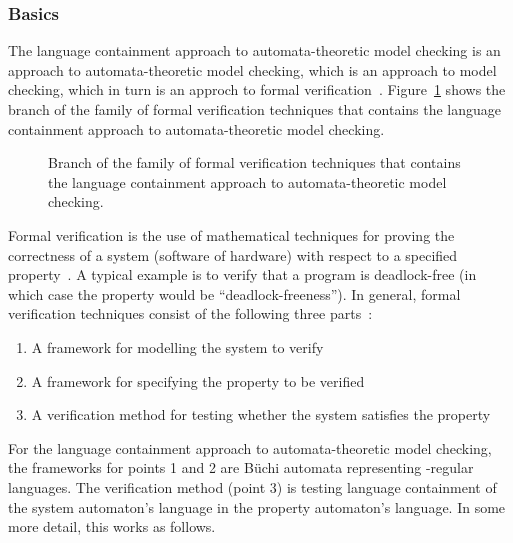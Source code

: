 \subsubsection{Basics}
The language containment approach to automata-theoretic model checking is an approach to automata-theoretic model checking, which is an approach to model checking, which in turn is an approch to formal verification~\cite{2007_vardi_model_checking}. Figure~\ref{model_checking} shows the branch of the family of formal verification techniques that contains the language containment approach to automata-theoretic model checking.

\begin{figure}[htb]
\centering
\ModelChecking
\caption{Branch of the family of formal verification techniques that contains the language containment approach to automata-theoretic model checking.}
\label{model_checking}
\end{figure}

Formal verification is the use of mathematical techniques for proving the correctness of a system (software of hardware) with respect to a specified property~\cite{2007_vardi_model_checking}. A typical example is to verify that a program is deadlock-free (in which case the property would be ``deadlock-freeness''). In general, formal verification techniques consist of the following three parts~\cite{huth2004logic}:

\begin{enumerate}
\item A framework for modelling the system to verify
\item A framework for specifying the property to be verified
\item A verification method for testing whether the system satisfies the property
\end{enumerate}

For the language containment approach to automata-theoretic model checking, the frameworks for points 1 and 2 are Büchi automata representing \om-regular languages. The verification method (point 3) is testing language containment of the system automaton's language in the property automaton's language. In some more detail, this works as follows.~\cite{1996_vardi}\cite{2007_vardi_model_checking}

